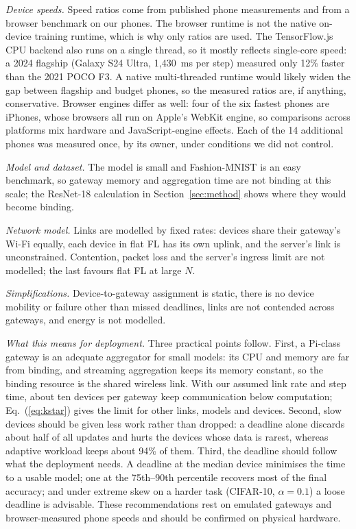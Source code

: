 \documentclass[conference]{IEEEtran}
\begin{document}
\textit{Device speeds.} Speed ratios come from published phone measurements and from a browser benchmark on our phones. The browser runtime is not the native on-device training runtime, which is why only ratios are used. The TensorFlow.js CPU backend also runs on a single thread, so it mostly reflects single-core speed: a 2024 flagship (Galaxy S24 Ultra, 1{,}430~ms per step) measured only 12\% faster than the 2021 POCO F3. A native multi-threaded runtime would likely widen the gap between flagship and budget phones, so the measured ratios are, if anything, conservative. Browser engines differ as well: four of the six fastest phones are iPhones, whose browsers all run on Apple's WebKit engine, so comparisons across platforms mix hardware and JavaScript-engine effects. Each of the 14 additional phones was measured once, by its owner, under conditions we did not control.

\textit{Model and dataset.} The model is small and Fashion-MNIST is an easy benchmark, so gateway memory and aggregation time are not binding at this scale; the ResNet-18 calculation in Section~\ref{sec:method} shows where they would become binding.

\textit{Network model.} Links are modelled by fixed rates: devices share their gateway's Wi-Fi equally, each device in flat FL has its own uplink, and the server's link is unconstrained. Contention, packet loss and the server's ingress limit are not modelled; the last favours flat FL at large $N$.

\textit{Simplifications.} Device-to-gateway assignment is static, there is no device mobility or failure other than missed deadlines, links are not contended across gateways, and energy is not modelled.

\textit{What this means for deployment.} Three practical points follow. First, a Pi-class gateway is an adequate aggregator for small models: its CPU and memory are far from binding, and streaming aggregation keeps its memory constant, so the binding resource is the shared wireless link. With our assumed link rate and step time, about ten devices per gateway keep communication below computation; Eq.~(\ref{eq:kstar}) gives the limit for other links, models and devices. Second, slow devices should be given less work rather than dropped: a deadline alone discards about half of all updates and hurts the devices whose data is rarest, whereas adaptive workload keeps about 94\% of them. Third, the deadline should follow what the deployment needs. A deadline at the median device minimises the time to a usable model; one at the 75th--90th percentile recovers most of the final accuracy; and under extreme skew on a harder task (CIFAR-10, $\alpha = 0.1$) a loose deadline is advisable. These recommendations rest on emulated gateways and browser-measured phone speeds and should be confirmed on physical hardware.
\end{document}
